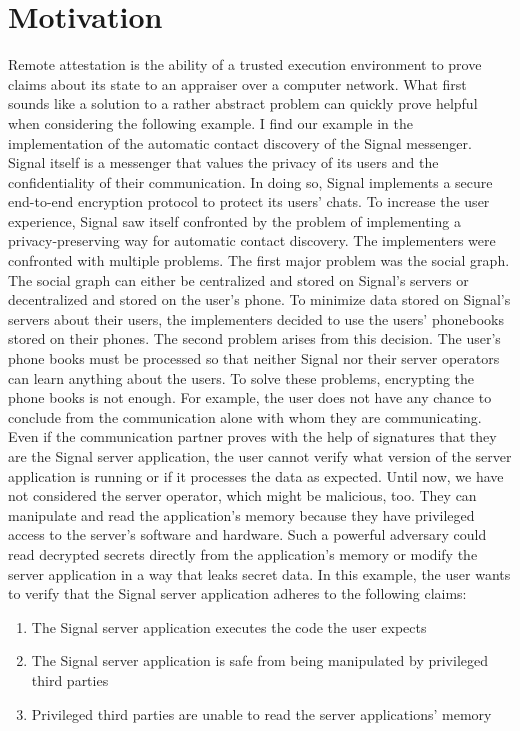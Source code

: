 \section{Motivation}
\label{sec:10:motivation}
Remote attestation is the ability of a trusted execution environment to prove
claims about its state to an appraiser over a computer network.
\cite{coker_principles_2011} What first sounds like a solution to a rather
abstract problem can quickly prove helpful when considering the following
example. I find our example in the implementation of the automatic contact
discovery of the Signal messenger. Signal itself is a messenger that values the
privacy of its users and the confidentiality of their communication. In doing
so, Signal implements a secure end-to-end encryption protocol to protect its
users' chats.\cite{cohn2020formal} To increase the user experience, Signal saw
itself confronted by the problem of implementing a privacy-preserving way for
automatic contact discovery.\cite{SignalCd} The implementers were confronted
with multiple problems. The first major problem was the social graph. The social
graph can either be centralized and stored on Signal's servers or decentralized
and stored on the user's phone. To minimize data stored on Signal's servers
about their users, the implementers decided to use the users' phonebooks stored
on their phones. The second problem arises from this decision. The user's phone
books must be processed so that neither Signal nor their server operators can
learn anything about the users. To solve these problems, encrypting the phone
books is not enough. For example, the user does not have any chance to conclude
from the communication alone with whom they are communicating. Even if the
communication partner proves with the help of signatures that they are the
Signal server application, the user cannot verify what version of the server
application is running or if it processes the data as expected. Until now, we
have not considered the server operator, which might be malicious, too. They can
manipulate and read the application's memory because they have privileged access
to the server's software and hardware. Such a powerful adversary could read
decrypted secrets directly from the application's memory or modify the server
application in a way that leaks secret data. In this example, the user wants to
verify that the Signal server application adheres to the following claims:
\begin{enumerate}
    \item The Signal server application executes the code the user expects
    \item The Signal server application is safe from being manipulated by
          privileged third parties
    \item Privileged third parties are unable to read the server applications'
          memory
\end{enumerate}

